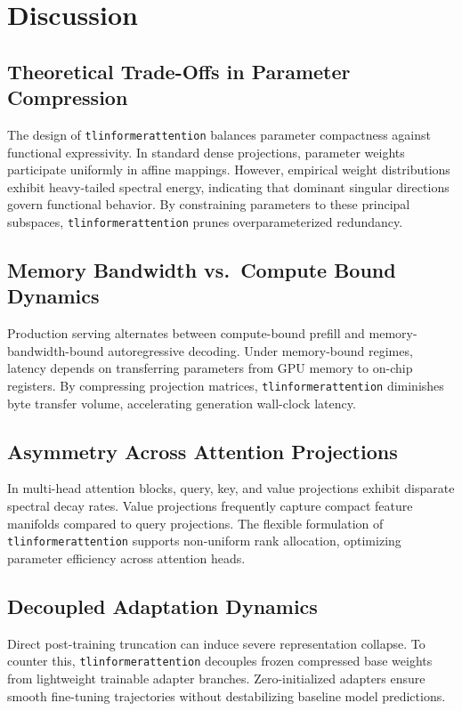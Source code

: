 \section{Discussion}

\subsection{Theoretical Trade-Offs in Parameter Compression}
The design of \texttt{tlinformerattention} balances parameter compactness against functional expressivity. In standard dense projections, parameter weights participate uniformly in affine mappings. However, empirical weight distributions exhibit heavy-tailed spectral energy, indicating that dominant singular directions govern functional behavior. By constraining parameters to these principal subspaces, \texttt{tlinformerattention} prunes overparameterized redundancy.

\subsection{Memory Bandwidth vs.\ Compute Bound Dynamics}
Production serving alternates between compute-bound prefill and memory-bandwidth-bound autoregressive decoding. Under memory-bound regimes, latency depends on transferring parameters from GPU memory to on-chip registers. By compressing projection matrices, \texttt{tlinformerattention} diminishes byte transfer volume, accelerating generation wall-clock latency.

\subsection{Asymmetry Across Attention Projections}
In multi-head attention blocks, query, key, and value projections exhibit disparate spectral decay rates. Value projections frequently capture compact feature manifolds compared to query projections. The flexible formulation of \texttt{tlinformerattention} supports non-uniform rank allocation, optimizing parameter efficiency across attention heads.

\subsection{Decoupled Adaptation Dynamics}
Direct post-training truncation can induce severe representation collapse. To counter this, \texttt{tlinformerattention} decouples frozen compressed base weights from lightweight trainable adapter branches. Zero-initialized adapters ensure smooth fine-tuning trajectories without destabilizing baseline model predictions.

